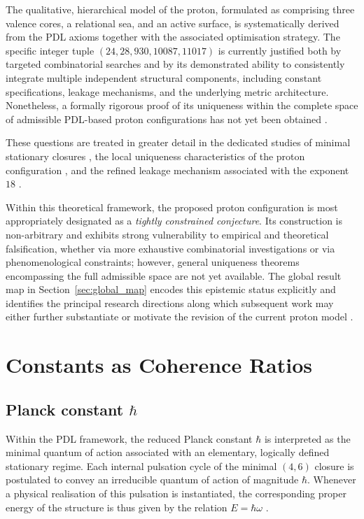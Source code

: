 \documentclass{article}
\begin{document}
The qualitative, hierarchical model of the proton, formulated as comprising three valence cores, a relational sea, and an active surface, is systematically derived from the PDL axioms together with the associated optimisation strategy. The specific integer tuple \((24,28,930,10087,11017)\) is currently justified both by targeted combinatorial searches and by its demonstrated ability to consistently integrate multiple independent structural components, including constant specifications, leakage mechanisms, and the underlying metric architecture. Nonetheless, a formally rigorous proof of its uniqueness within the complete space of admissible PDL-based proton configurations has not yet been obtained
\citep{Combinatorial_Proton_v2_2026,PDL_position}.

These questions are treated in greater detail in the dedicated studies of minimal stationary closures \citep{Minimal_Stationary_Closures_2026}, the local uniqueness characteristics of the proton configuration \citep{Proton_Local_Uniqueness_2026,Combinatorial_Proton_v2_2026}, and the refined leakage mechanism associated with the exponent \(18\) \citep{Coherence_Leakage_18_2026,Exponent_18_PDL_2026}.

Within this theoretical framework, the proposed proton configuration is most appropriately designated as a \emph{tightly constrained conjecture}. Its construction is non-arbitrary and exhibits strong vulnerability to empirical and theoretical falsification, whether via more exhaustive combinatorial investigations or via phenomenological constraints; however, general uniqueness theorems encompassing the full admissible space are not yet available. The global result map in Section~\ref{sec:global_map} encodes this epistemic status explicitly and identifies the principal research directions along which subsequent work may either further substantiate or motivate the revision of the current proton model \citep{PDL_position}.

\section{Constants as Coherence Ratios}
\label{sec:constants}

\subsection{Planck constant \texorpdfstring{\(\hbar\)}{hbar}}
\label{subsec:hbar}

Within the PDL framework, the reduced Planck constant \(\hbar\) is interpreted as the minimal quantum of action associated with an elementary, logically defined stationary regime. Each internal pulsation cycle of the minimal \((4,6)\) closure is postulated to convey an irreducible quantum of action of magnitude \(\hbar\). Whenever a physical realisation of this pulsation is instantiated, the corresponding proper energy of the structure is thus given by the relation \(E = \hbar \omega\)
\citep{PDL_Main_2026,PDL_intro}.
\end{document}
